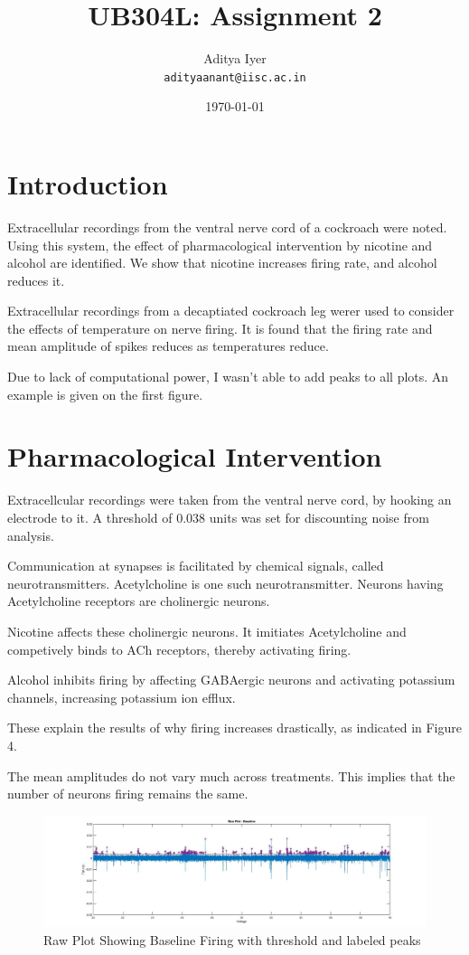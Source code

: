 \documentclass{article}
\title{UB304L: Assignment 2} %
\author{Aditya Iyer\\ \texttt{adityaanant@iisc.ac.in}} %
\date{\today} %
\begin{document}
\maketitle %

\section*{Introduction} %

Extracellular recordings from the ventral nerve cord of a cockroach were noted. Using this system, the effect of pharmacological intervention by nicotine and alcohol are identified. We show that nicotine increases firing rate, and alcohol reduces it.

Extracellular recordings from a decaptiated cockroach leg werer used to consider the effects of temperature on nerve firing. It is found that the firing rate and mean amplitude of spikes reduces as temperatures reduce.

Due to lack of computational power, I wasn't able to add peaks to all plots. An example is given on the first figure.


\section{Pharmacological Intervention} %
Extracellcular recordings were taken from the ventral nerve cord, by hooking an electrode to it. A threshold of 0.038 units was set for discounting noise from analysis.

Communication at synapses is facilitated by chemical signals, called neurotransmitters. Acetylcholine is one such neurotransmitter. Neurons having Acetylcholine receptors are cholinergic neurons.

Nicotine affects these cholinergic neurons. It imitiates Acetylcholine and competively binds to ACh receptors, thereby activating firing.

Alcohol inhibits firing by affecting GABAergic neurons and activating potassium channels, increasing potassium ion efflux.

These explain the results of why firing increases drastically, as indicated in Figure 4.

The mean amplitudes do not vary much across treatments. This implies that the number of neurons firing remains the same.

\begin{figure}
  \includegraphics[width=\linewidth]{baseline.jpg}
  \caption{Raw Plot Showing Baseline Firing with threshold and labeled peaks}
  \label{fig: Raw Plot Showing Baseline Firing}
\end{figure}
\end{document}
